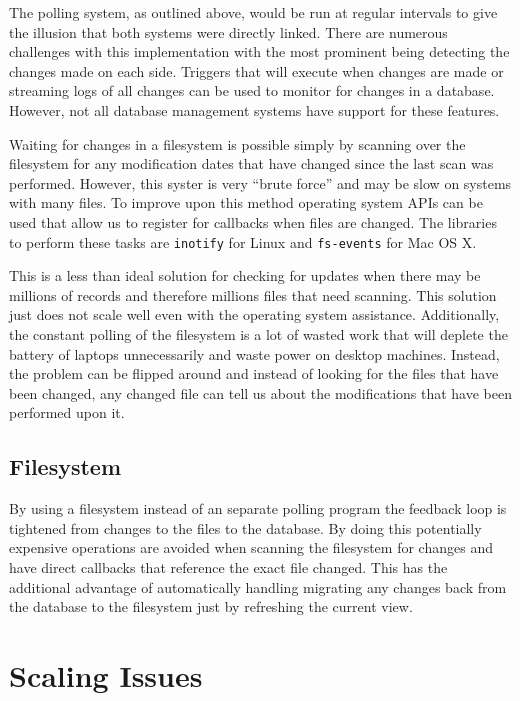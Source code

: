 The polling system, as outlined above, would be run at regular intervals to
give the illusion that both systems were directly linked. There are numerous
challenges with this implementation with the most prominent being detecting the
changes made on each side. Triggers that will execute when changes are made or
streaming logs of all changes can be used to monitor for changes in a database.
However, not all database management systems have support for these features.

Waiting for changes in a filesystem is possible simply by scanning over the
filesystem for any modification dates that have changed since the last scan was
performed. However, this syster is very ``brute force'' and may be slow on
systems with many files. To improve upon this method operating system APIs can
be used that allow us to register for callbacks when files are changed. The
libraries to perform these tasks are \texttt{inotify} for Linux and
\texttt{fs-events} for Mac OS X.

This is a less than ideal solution for checking for updates when there may be
millions of records and therefore millions files that need scanning. This
solution just does not scale well even with the operating system assistance.
Additionally, the constant polling of the filesystem is a lot of wasted work
that will deplete the battery of laptops unnecessarily and waste power on
desktop machines. Instead, the problem can be flipped around and instead of
looking for the files that have been changed, any changed file can tell us
about the modifications that have been performed upon it.

\subsection{Filesystem}

By using a filesystem instead of an separate polling program the feedback loop
is tightened from changes to the files to the database. By doing this
potentially expensive operations are avoided when scanning the filesystem for
changes and have direct callbacks that reference the exact file changed. This
has the additional advantage of automatically handling migrating any changes
back from the database to the filesystem just by refreshing the current view.

\section{Scaling Issues}

